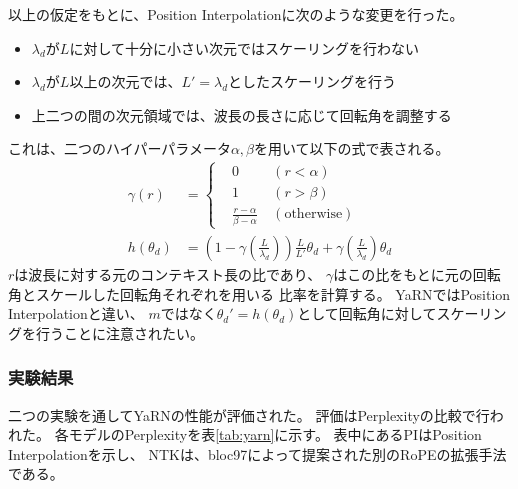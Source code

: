 \documentclass{jsarticle}
\begin{document}
        以上の仮定をもとに、Position Interpolationに次のような変更を行った。
        \begin{itemize}
            \item $\lambda_d$が$L$に対して十分に小さい次元ではスケーリングを行わない
            \item $\lambda_d$が$L$以上の次元では、$L'=\lambda_d$としたスケーリングを行う
            \item 上二つの間の次元領域では、波長の長さに応じて回転角を調整する
        \end{itemize}
        これは、二つのハイパーパラメータ$\alpha,\beta$を用いて以下の式で表される。
        \begin{align*}
            \gamma(r) &= \left\{ \begin{aligned}
                &0 \ &(r < \alpha) \\
                &1 \ &(r > \beta) \\
                &\frac{r-\alpha}{\beta-\alpha} \ &(\mathrm{otherwise})
            \end{aligned}\right. \\
            h(\theta_d) &= \left(1-\gamma\left(\frac{L}{\lambda_d}\right)\right)\frac{L}{L'}\theta_d + \gamma\left(\frac{L}{\lambda_d}\right)\theta_d
        \end{align*}
        $r$は波長に対する元のコンテキスト長の比であり、
        $\gamma$はこの比をもとに元の回転角とスケールした回転角それぞれを用いる
        比率を計算する。
        YaRNではPosition Interpolationと違い、
        $m$ではなく$\theta_d'=h(\theta_d)$として回転角に対してスケーリングを行うことに注意されたい。

        \subsubsection{実験結果}
            二つの実験を通してYaRNの性能が評価された。
            評価はPerplexityの比較で行われた。
            各モデルのPerplexityを表\ref{tab:yarn}に示す。
            表中にあるPIはPosition Interpolationを示し、
            NTKは、bloc97\cite{ntk}によって提案された別のRoPEの拡張手法である。
\end{document}
